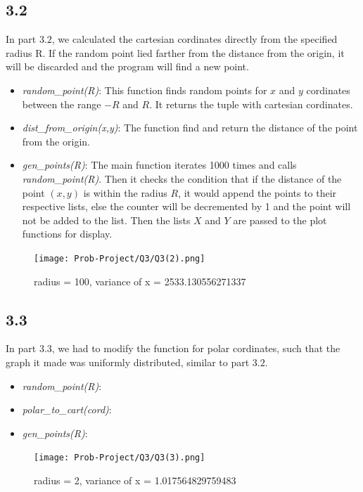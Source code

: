 \documentclass[answers]{exam}
\begin{document}
\subsection*{3.2}
\begin{framed}
  \indent In part $3.2$, we calculated the cartesian cordinates directly from the specified radius R. If the random point lied farther from the distance from the origin, it will be discarded and the program will find a new point.
  \begin{itemize}
    \item \emph{random\_point(R)}: This function finds random points for $x$ and $y$ cordinates between the range $-R$ and $R$. It returns the tuple with cartesian cordinates.
    \item \emph{dist\_from\_origin(x,y)}: The function find and return the distance of the point from the origin.
    \item \emph{gen\_points(R)}: The main function iterates 1000 times and calls \emph{random\_point(R)}. Then it checks the condition that if the distance of the point $(x,y)$ is within the radius $R$, it would append the points to their respective lists, else the counter will be decremented by 1 and the point will not be added to the list. Then the lists $X$ and $Y$ are passed to the plot functions for display.
  \end{itemize}
\end{framed}

\begin{figure}[h]
  \caption{radius = 100, variance of x = 2533.130556271337}
  \centering
  \texttt{[image: Prob-Project/Q3/Q3(2).png]}
\end{figure}


\subsection*{3.3}
\begin{framed}
  \indent In part $3.3$, we had to modify the function for polar cordinates, such that the graph it made was uniformly distributed, similar to part $3.2$.

  \begin{itemize}
    \item \emph{random\_point(R)}:
    \item \emph{polar\_to\_cart(cord)}:
    \item \emph{gen\_points(R)}:
  \end{itemize}
\end{framed}


\begin{figure}[h]
  \caption{radius = 2, variance of x = 1.017564829759483}
  \centering
  \texttt{[image: Prob-Project/Q3/Q3(3).png]}
\end{figure}
\end{document}
